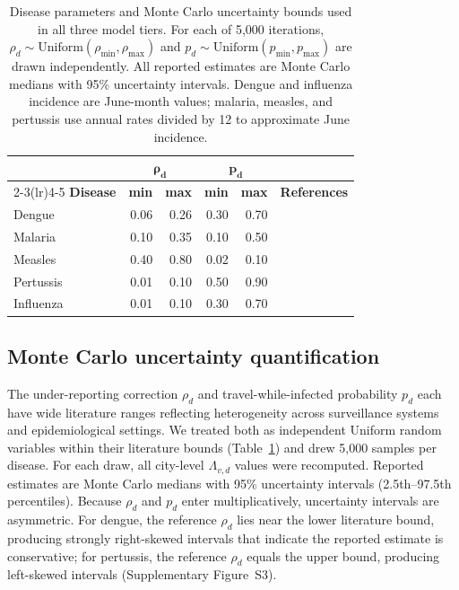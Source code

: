 \documentclass[12pt, a4paper]{article}
\begin{document}
\begin{table}[htbp]
\centering
\caption{Disease parameters and Monte Carlo uncertainty bounds used in all three model tiers. For each of 5,000 iterations, $\rho_d \sim \mathrm{Uniform}(\rho_{\min},\rho_{\max})$ and $p_d \sim \mathrm{Uniform}(p_{\min},p_{\max})$ are drawn independently. All reported estimates are Monte Carlo medians with 95\% uncertainty intervals. Dengue and influenza incidence are June-month values; malaria, measles, and pertussis use annual rates divided by 12 to approximate June incidence.}
\label{tab:params}
\small
\setlength{\tabcolsep}{6pt}
\begin{tabular}{l rr rr l}
\toprule
&
  \multicolumn{2}{c}{$\boldsymbol{\rho_d}$} &
  \multicolumn{2}{c}{$\boldsymbol{p_d}$} & \\
\cmidrule(lr){2-3}\cmidrule(lr){4-5}
\textbf{Disease} &
  \textbf{min} & \textbf{max} &
  \textbf{min} & \textbf{max} &
  \textbf{References} \\
\midrule
Dengue    & 0.06 & 0.26 & 0.30 & 0.70 & \citep{Bhatt2013,undurraga2013} \\[3pt]
Malaria   & 0.10 & 0.35 & 0.10 & 0.50 & \citep{whoWMR2024,lindblade2013,topazian2020} \\[3pt]
Measles   & 0.40 & 0.80 & 0.02 & 0.10 & \citep{simons2012,whittle1999,helfand1998} \\[3pt]
Pertussis & 0.01 & 0.10 & 0.50 & 0.90 & \citep{chen2016,craig2020,althouse2015} \\[3pt]
Influenza & 0.01 & 0.10 & 0.30 & 0.70 & \citep{mccarthy2020,hayward2014,carrat2008,leung2015} \\
\bottomrule
\end{tabular}
\end{table}

\subsection{Monte Carlo uncertainty quantification}

The under-reporting correction $\rho_d$ and travel-while-infected probability $p_d$ each have wide literature ranges reflecting heterogeneity across surveillance systems and epidemiological settings. We treated both as independent Uniform random variables within their literature bounds (Table~\ref{tab:params}) and drew 5,000 samples per disease. For each draw, all city-level $\Lambda_{v,d}$ values were recomputed. Reported estimates are Monte Carlo medians with 95\% uncertainty intervals (2.5th--97.5th percentiles). Because $\rho_d$ and $p_d$ enter multiplicatively, uncertainty intervals are asymmetric. For dengue, the reference $\rho_d$ lies near the lower literature bound, producing strongly right-skewed intervals that indicate the reported estimate is conservative; for pertussis, the reference $\rho_d$ equals the upper bound, producing left-skewed intervals (Supplementary Figure~S3).
\end{document}
